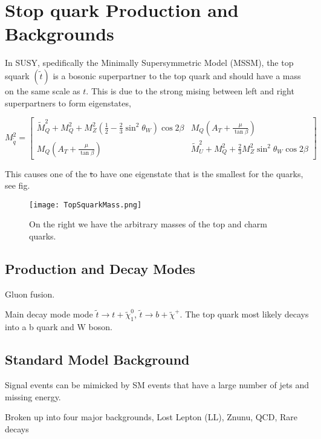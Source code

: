 \chapter{Stop quark Production and Backgrounds}
\label{ch:Search}

In SUSY, spedifically the Minimally Supersymmetric Model (MSSM), the top squark $(\widetilde{t})$ is a bosonic superpartner to the top quark and should have a mass on the same scale as $t$. This is due to the strong mising between left and right superpartners to form eigenstates,

\begin{equation}
M_{\widetilde{q}}^2=
\begin{bmatrix}
\widetilde{M}_Q^2+M_Q^2+M_Z^2(\frac{1}{2}-\frac{2}{3}\sin^2\theta_W)\cos2\beta & M_Q(A_T+\frac{\mu}{\tan\beta}) \\
M_Q(A_T+\frac{\mu}{\tan\beta}) & \widetilde{M}_U^2+M_Q^2+\frac{2}{3}M_Z^2\sin^2\theta_W\cos2\beta
\end{bmatrix}
\end{equation}

This causes one of the \st to have one eigenstate that is the smallest for the quarks, see fig. 

\begin{figure}
\centering
	\texttt{[image: TopSquarkMass.png]}
 	\caption{On the right we have the arbitrary masses of the top and charm quarks.}
 	\label{StopMass} 
\end{figure}

\section{Production and Decay Modes}
\label{sec:Production}

Gluon fusion.

Main decay mode mode $\tilde{t}\rightarrow t+\tilde{\chi}^{0}_{1}$, $\tilde{t}\rightarrow b+\tilde{\chi}^{+}$. The top quark most likely decays into a b quark and W boson. 

\section{Standard Model Background}
\label{sec:SMBackground}

Signal events can be mimicked by SM events that have a large number of jets and missing energy. 

Broken up into four major backgrounds, Lost Lepton (LL), Znunu, QCD, Rare decays

